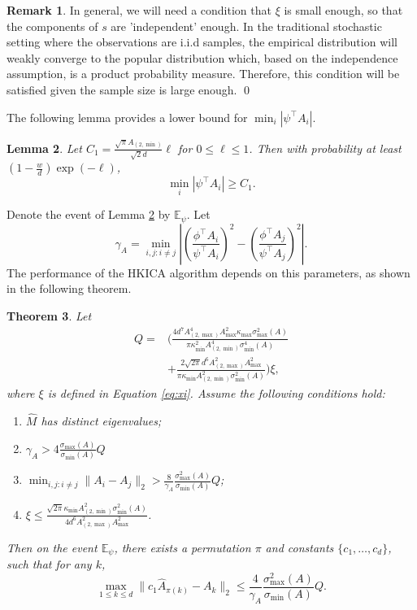 \documentclass[twoside]{article}
\newcommand{\Epsi}{\mathbb{E}_{\psi}}
\newtheorem{lemma}{Lemma}[section]
\newtheorem{thm}[lemma]{Theorem}
\theoremstyle{definition}
\newtheorem{remark}[lemma]{Remark}
\begin{document}
\begin{remark}
\label{rmk:xi}
In general, we will need a condition that $\xi$ is small enough, so that the components of $s$ are 'independent' enough.
In the traditional stochastic setting where the observations are i.i.d samples, the empirical distribution will weakly converge to the popular distribution which, based on the independence assumption, is a product probability measure. 
Therefore, this condition will be satisfied given the sample size is large enough. \qed
\end{remark} 

The following lemma provides a lower bound for $\min_i |\psi^{\top}A_i|$.
\begin{lemma}
\label{lem:dmin}
Let $C_1 = \frac{\sqrt{\pi}A_{(2,\min)}}{\sqrt{2}d} \ell$ for $0\le \ell\le 1$. Then with probability at least $\left(1- \frac{w}{d}\right)\exp(-\ell)$, 
\[\min_i |\psi^{\top}A_i| \ge C_1.\] 
\end{lemma}
Denote the event of Lemma \ref{lem:dmin} by $\Epsi$.
Let 
\begin{equation}
\label{def:kappa}
\gamma_A =  \min_{i,j: i\neq j} \left\vert \left(\frac{\phi^{\top}A_i}{\psi^{\top}A_i}\right)^2 - \left(\frac{\phi^{\top}A_j}{\psi^{\top}A_j}\right)^2 \right\vert. 
\end{equation}
The performance of the HKICA algorithm depends on this parameters, as shown in the following theorem.
\begin{thm}
 \label{thm:efficiency}
Let 
 \begin{align*}
 Q = &\Big(\frac{4d^7A_{(2,\max)}^4A_{\max}^2\kappa_{\max}\sigma_{\max}^2(A) }{\pi\kappa^2_{\min}A^4_{(2,\min)}\sigma_{\min}^4(A)} \\
 & + \frac{2\sqrt{2\pi}d^6A_{(2,\max)}^2A_{\max}^2}{\pi\kappa_{\min}A^2_{(2,\min)}\sigma_{\min}^2(A)} \Big)
  \xi,
 \end{align*}
 where $\xi$ is defined in Equation \eqref{eq:xi}. Assume the following conditions hold:
 \begin{enumerate}
 \vspace{-3mm}
 \item $\widehat{M}$ has distinct eigenvalues;
 \item $\gamma_A > 4\frac{\sigma_{\max}(A)}{\sigma_{\min}(A)} Q$
 \item $\min_{i,j:i\neq j} \|A_i - A_j\|_2 > \frac{8}{\gamma_A}\frac{\sigma_{\max}^2(A)}{\sigma_{\min}(A) } Q$;
 \item $\xi \le \frac{\sqrt{2\pi}\kappa_{\min}A^2_{(2,\min)}\sigma_{\min}^2(A)}{4d^6 A_{(2,\max)}^2A_{\max}^2}$.
  \end{enumerate}
 Then on the event $\Epsi$, there exists a permutation $\pi$ and constants $\{c_1,\ldots,c_d\}$, such that for any $k$,
 \[
  \max_{1\le k\le d}\| c_1\widehat{A}_{\pi(k)} - A_k\|_2 \le \frac{4}{\gamma_A} \frac{\sigma_{\max}^2(A)}{ \sigma_{\min}(A)}Q.
  \]
 \end{thm}
\end{document}
